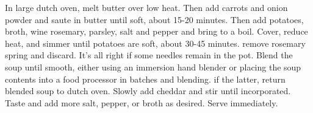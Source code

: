 In large dutch oven, melt butter over low heat. Then add carrots and onion powder and saute in butter until soft, about 15-20 minutes. Then add potatoes, broth, wine rosemary, parsley, salt and pepper and bring to a boil. Cover, reduce heat, and simmer until potatoes are soft, about 30-45 minutes. remove rosemary spring and discard. It's all right if some needles remain in the pot. Blend the soup until smooth, either using an immersion hand blender or placing the soup contents into a food processor in batches and blending. if the latter, return blended soup to dutch oven. Slowly add cheddar and stir until incorporated. Taste and add more salt, pepper, or broth as desired. Serve immediately.